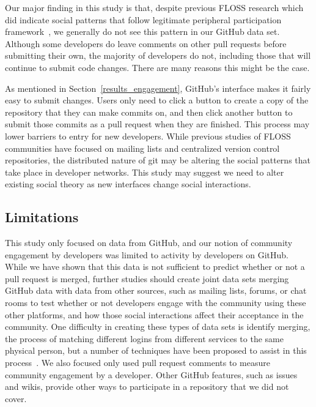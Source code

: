 \documentclass{sigchi}
\begin{document}
Our major finding in this study is that, despite previous FLOSS research which
did indicate social patterns that follow legitimate peripheral participation
framework~\cite{ducheneaut_socialization_2005, huang_mining_2005, ye_toward_2003},
we generally do not see this pattern in our GitHub data set. Although some
developers do leave comments on other pull requests before submitting their own,
the majority of developers do not, including those that will continue to submit
code changes. There are many reasons this might be the case.

As mentioned in Section~\ref{results_engagement}, GitHub's interface makes it
fairly easy to submit changes. Users only need to click a button to create a
copy of the repository that they can make commits on, and then click another
button to submit those commits as a pull request when they are finished. This
process may lower barriers to entry for new developers. While previous studies
of FLOSS communities have focused on mailing lists and centralized version
control repositories, the distributed nature of git may be altering the social
patterns that take place in developer networks. This study may suggest we need
to alter existing social theory as new interfaces change social interactions.

\subsection{Limitations} \label{sec:limitations}

This study only focused on data from GitHub, and our notion of community
engagement by developers was limited to activity by developers on GitHub. While
we have shown that this data is not sufficient to predict whether or not a pull
request is merged, further studies should create joint data sets merging GitHub
data with data from other sources, such as mailing lists, forums, or chat rooms
to test whether or not developers engage with the community using these other
platforms, and how those social interactions affect their acceptance in the
community. One difficulty in creating these types of data sets is identify
merging, the process of matching different logins from different services to the
same physical person, but a number of techniques have been proposed to assist in
this process~\cite{bird_open_2007, goeminne_comparison_2013, kouters_whos_2012}.
We also focused only used pull request comments to measure community engagement
by a developer. Other GitHub features, such as issues and wikis, provide other
ways to participate in a repository that we did not cover.
\end{document}
